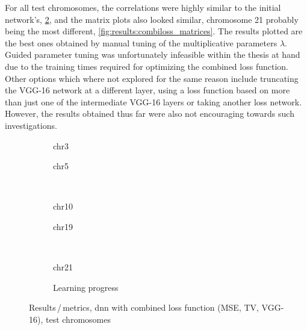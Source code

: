 For all test chromosomes, the correlations were highly similar to the initial network's, \cref{fig:results:combilossDNN_pearson},
and the matrix plots also looked similar, chromosome 21 probably being the most different, \cref{fig:results:combiloss_matrices}.
The results plotted are the best ones obtained by manual tuning of the multiplicative parameters $\lambda$. 
Guided parameter tuning was unfortunately infeasible within the thesis at hand due to the training times required for optimizing the combined loss function.
Other options which where not explored for the same reason include truncating the VGG-16 network at a different layer, using a loss function based on
more than just one of the intermediate VGG-16 layers \cite{Johnson2016} or taking another loss network.
However, the results obtained thus far were also not encouraging towards such investigations.
\begin{figure}[p] %
    \begin{subfigure}{0.45\textwidth}
        \scriptsize
        \caption{chr3}
    \end{subfigure} \hfill
    \begin{subfigure}{0.45\textwidth}
        \scriptsize
        \caption{chr5}
    \end{subfigure}\\[5mm]
    \begin{subfigure}{0.45\textwidth}
        \scriptsize
        \caption{chr10}
    \end{subfigure}\hfill
    \begin{subfigure}{0.45\textwidth}
        \scriptsize
        \caption{chr19}
    \end{subfigure}\\[3mm]
    \centering
    \begin{subfigure}{0.45\textwidth}
        \scriptsize
        \caption{chr21}
    \end{subfigure}\hfill
    \begin{subfigure}{0.45\textwidth}
        \caption{Learning progress} \label{fig:results:combilossDNN_lossEpochs}
    \end{subfigure}
    \caption{Results\,/\,metrics, \acrshort{dnn} with combined loss function (MSE, TV, VGG-16),  test chromosomes}
    \label{fig:results:combilossDNN_pearson}
\end{figure}
